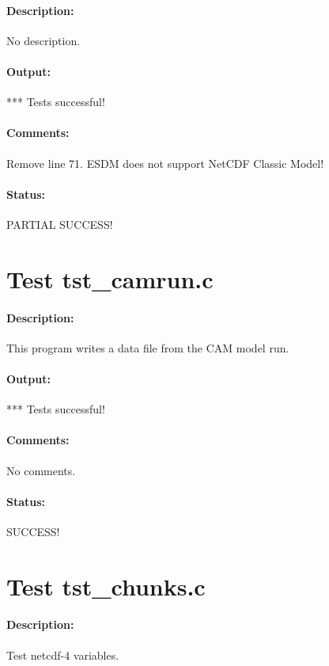 \paragraph{Description:} No description.

\paragraph{Output:} *** Tests successful!

\paragraph{Comments:} Remove line 71. ESDM does not support NetCDF Classic Model!

\paragraph{Status:} PARTIAL SUCCESS!

\section{Test tst\_camrun.c}

\paragraph{Description:} This program writes a data file from the CAM model run.

\paragraph{Output:} *** Tests successful!

\paragraph{Comments:} No comments.

\paragraph{Status:} SUCCESS!

\section{Test tst\_chunks.c}

\paragraph{Description:} Test netcdf-4 variables.

